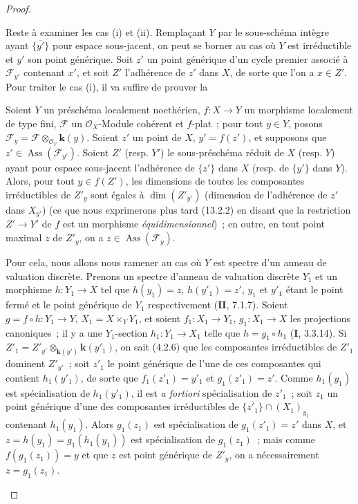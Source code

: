 \begin{proof}
\begin{env}[12.1.1.4]
\label{IV.12.1.1.4-fr}
Reste à examiner les cas (i) et (ii). Remplaçant $Y$ par le sous-schéma intègre
ayant $\overline{\{y'\}}$ pour espace sous-jacent, on peut se borner au cas où
$Y$ est irréductible et $y'$ son point générique. Soit $z'$ un point générique
d'un cycle premier associé à $\mathcal F_{y'}$
contenant $x'$, et soit $Z'$ l'adhérence de $z'$ dans $X$, de sorte que l'on a
$x\in Z'$. Pour traiter le cas (i), il va suffire de prouver la

\begin{proposition}[12.1.1.5]
\label{IV.12.1.1.5-fr}
Soient $Y$ un préschéma localement noethérien, $f:X\to Y$ un morphisme
localement de type fini, $\mathcal F$ un $\mathcal O_X$-Module cohérent et
$f$-\textup{plat}~; pour tout $y\in Y$, posons
$\mathcal F_y=\mathcal F\otimes_{\mathcal O_Y}\boldsymbol{k}(y)$. Soient $z'$ un point de
$X$, $y'=f(z')$, et supposons que $z'\in\operatorname{Ass}(\mathcal F_{y'})$.
Soient $Z'$ \textup{(resp. $Y'$)} le sous-préschéma réduit de $X$ \textup{(resp. $Y$)} ayant
pour espace sous-jacent l'adhérence de $\{z'\}$ dans $X$ \textup{(resp.} de $\{y'\}$
dans $Y$\textup{)}. Alors, pour tout $y\in f(Z')$, les dimensions de toutes les
composantes irréductibles de $Z'_y$ sont égales à $\dim(Z'_{y'})$ (dimension
de l'adhérence de $z'$ dans $X_{y'}$) \textup{(ce que nous exprimerons plus tard
(13.2.2) en disant que la restriction $Z'\to Y'$ de $f$ est un morphisme
\emph{équidimensionnel})}~; en outre, en tout point maximal $z$ de $Z'_y$, on a
$z\in\operatorname{Ass}(\mathcal F_y)$.
\end{proposition}

Pour cela, nous allons nous ramener au cas où $Y$ est spectre d'un anneau de
valuation discrète. Prenons un spectre d'anneau de valuation discrète $Y_1$ et
un morphisme $h:Y_1\to X$ tel que $h(y_1)=z$, $h(y'_1)=z'$, $y_1$ et $y'_1$
étant le point fermé et le point générique de $Y_1$ respectivement
($\mathbf{II}$, 7.1.7). Soient $g=f\circ h:Y_1\to Y$,
$X_1=X\times_YY_1$, et soient $f_1:X_1\to Y_1$, $g_1:X_1\to X$ les projections
canoniques~; il y a une $Y_1$-section $h_1:Y_1\to X_1$ telle que
$h=g_1\circ h_1$ ($\mathbf I$, 3.3.14). Si
$Z'_1=Z'_{y'}\otimes_{\mathbf{k}(y')}\boldsymbol{k}(y'_1)$, on sait (4.2.6) que les composantes
irréductibles de $Z'_1$ dominent $Z'_{y'}$~; soit $z'_1$ le point générique de
l'une de ces composantes qui contient $h_1(y'_1)$, de sorte que
$f_1(z'_1)=y'_1$ et $g_1(z'_1)=z'$. Comme $h_1(y_1)$ est spécialisation de
$h_1(y'_1)$, il est \emph{a fortiori} spécialisation de $z'_1$~; soit $z_1$ un
point générique d'une des composantes irréductibles de
$\overline{\{z'_1\}}\cap(X_1)_{y_1}$ contenant $h_1(y_1)$. Alors $g_1(z_1)$
est spécialisation de $g_1(z'_1)=z'$ dans $X$, et
$z=h(y_1)=g_1(h_1(y_1))$ est spécialisation de $g_1(z_1)$~; mais comme
$f(g_1(z_1))=y$ et que $z$ est point générique de $Z'_y$, on a nécessairement
$z=g_1(z_1)$.


\end{env}
\end{proof}
